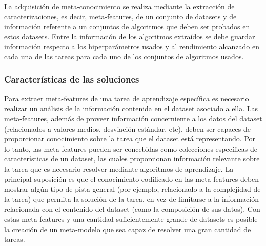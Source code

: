 
La adquisición de meta-conocimiento se realiza mediante la extracción de caracterizaciones, es decir, meta-features, de un conjunto de datasets y de información referente a un conjuntos de algoritmos que deben ser probados en estos datasets. Entre la información de los algoritmos extraídos se debe guardar información respecto a los hiperparámetros usados y al rendimiento alcanzado en cada una de las tareas para cada uno de los conjuntos de algoritmos usados.

\subsubsection{Características de las soluciones}\label{subsub:metafeat}

Para extraer meta-features de una tarea de aprendizaje específica es necesario realizar un análisis de la información contenida en el dataset asociado a ella. Las meta-features, además de proveer información concerniente a los datos del dataset (relacionados a valores medios, desviación estándar, etc), deben ser capaces de proporcionar conocimiento sobre la tarea que el dataset está representando.  Por lo tanto, las meta-features pueden ser concebidas como colecciones específicas de características de un dataset, las cuales proporcionan información relevante sobre la tarea que es necesario resolver mediante algoritmos de aprendizaje. La principal suposición es que el conocimiento codificado en las meta-features deben mostrar algún tipo de pista general (por ejemplo, relacionado a la complejidad de la tarea) que permita la solución de la tarea, en vez de limitarse a la información relacionada con el contenido del dataset (como la composición de sus datos). Con estas meta-features y una cantidad suficientemente grande de datasets es posible la creación de un meta-modelo que sea capaz de resolver una gran cantidad de tareas.


